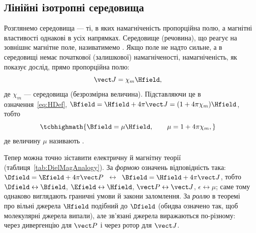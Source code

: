 \subsection*{Лінійні ізотропні середовища}

Розглянемо  середовища --- ті, в яких
намагніченість пропорційна полю, а магнітні властивості однакові в усіх
напрямках. Середовище (речовина), що реагує на зовнішнє магнітне поле, називатимемо
. Якщо поле не надто сильне, а в середовищі немає
початкової (залишкової) намагніченості, намагніченість, як показує дослід,
прямо пропорційна полю:
\begin{equation}\label{eq:LinearMedium}
	\vect J = \chi_m\Hfield,
\end{equation}
де $\chi_m$ ---  середовища (безрозмірна
величина). Підставляючи це в означення~\eqref{eq:HDef},
$\Bfield = \Hfield + 4\pi\vect J = (1+4\pi\chi_m)\Hfield$, тобто
\begin{equation}\label{eq:BMuH}
	\tcbhighmath{
		\Bfield = \mu\Hfield, \qquad \mu = 1+4\pi\chi_m,
	}
\end{equation}
де величину $\mu$ називають .

Тепер можна точно зіставити електричну й магнітну теорії (таблиця~\ref{tab:DielMagAnalogy}). За \emph{формою} означень відповідність така: $\Dfield=\Efield+4\pi\vect P$ \,$\leftrightarrow$\, $\Bfield=\Hfield+4\pi\vect J$, тобто $\Dfield\leftrightarrow\Bfield$, $\Efield\leftrightarrow\Hfield$, $\vect P\leftrightarrow\vect J$, $\epsilon\leftrightarrow\mu$; саме тому однаково виглядають граничні умови й закони заломлення. За \emph{роллю} в теоремі про вільні джерела $\Hfield$ подібний до $\Dfield$ (обидва означено так, щоб молекулярні джерела випали), але зв'язані джерела виражаються по-різному: через дивергенцію для $\vect P$ і через ротор для $\vect J$.

